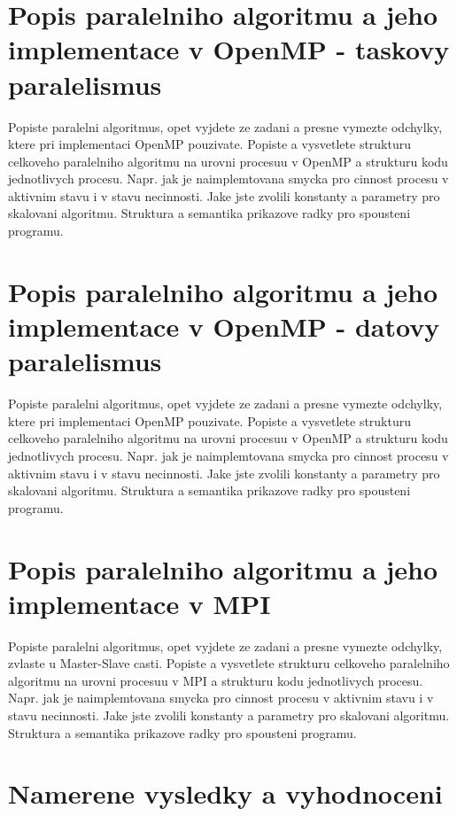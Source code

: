 \section{Popis paralelniho algoritmu a jeho implementace v OpenMP - taskovy paralelismus}

Popiste paralelni algoritmus, opet vyjdete ze zadani a presne vymezte
odchylky, ktere pri implementaci OpenMP pouzivate.
Popiste a vysvetlete strukturu celkoveho
paralelniho algoritmu na urovni procesuu v OpenMP a strukturu kodu
jednotlivych procesu. Napr. jak je naimplemtovana smycka pro cinnost
procesu v aktivnim stavu i v stavu necinnosti. Jake jste zvolili
konstanty a parametry pro skalovani algoritmu. Struktura a semantika
prikazove radky pro spousteni programu.


\section{Popis paralelniho algoritmu a jeho implementace v OpenMP - datovy paralelismus}

Popiste paralelni algoritmus, opet vyjdete ze zadani a presne vymezte
odchylky, ktere pri implementaci OpenMP pouzivate.
Popiste a vysvetlete strukturu celkoveho
paralelniho algoritmu na urovni procesuu v OpenMP a strukturu kodu
jednotlivych procesu. Napr. jak je naimplemtovana smycka pro cinnost
procesu v aktivnim stavu i v stavu necinnosti. Jake jste zvolili
konstanty a parametry pro skalovani algoritmu. Struktura a semantika
prikazove radky pro spousteni programu.

\section{Popis paralelniho algoritmu a jeho implementace v MPI}

Popiste paralelni algoritmus, opet vyjdete ze zadani a presne vymezte
odchylky, zvlaste u Master-Slave casti. Popiste a vysvetlete strukturu celkoveho
paralelniho algoritmu na urovni procesuu v MPI a strukturu kodu
jednotlivych procesu. Napr. jak je naimplemtovana smycka pro cinnost
procesu v aktivnim stavu i v stavu necinnosti. Jake jste zvolili
konstanty a parametry pro skalovani algoritmu. Struktura a semantika
prikazove radky pro spousteni programu.

\section{Namerene vysledky a vyhodnoceni}

